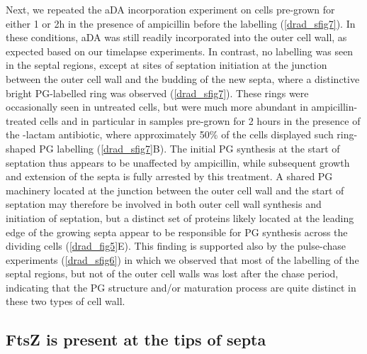 Next, we repeated the aDA incorporation experiment on cells pre-grown for either 1 or 2h in the presence of ampicillin before the labelling (\autoref{drad_sfig7}).
In these conditions, aDA was still readily incorporated into the outer cell wall, as expected based on our timelapse experiments.
In contrast, no labelling was seen in the septal regions, except at sites of septation initiation at the junction between the outer cell wall and the budding of the new septa, where a distinctive bright PG-labelled ring was observed (\autoref{drad_sfig7}).
These rings were occasionally seen in untreated cells, but were much more abundant in ampicillin-treated cells and in particular in samples pre-grown for 2 hours in the presence of the \beta-lactam antibiotic, where approximately 50\% of the cells displayed such ring-shaped PG labelling (\autoref{drad_sfig7}B).
The initial PG synthesis at the start of septation thus appears to be unaffected by ampicillin, while subsequent growth and extension of the septa is fully arrested by this treatment.
A shared PG machinery located at the junction between the outer cell wall and the start of septation may therefore be involved in both outer cell wall synthesis and initiation of septation, but a distinct set of proteins likely located at the leading edge of the growing septa appear to be responsible for PG synthesis across the dividing cells (\autoref{drad_fig5}E).
This finding is supported also by the pulse-chase experiments (\autoref{drad_sfig6}) in which we observed that most of the labelling of the septal regions, but not of the outer cell walls was lost after the chase period, indicating that the PG structure and/or maturation process are quite distinct in these two types of cell wall.

\FloatBarrier

\subsection{FtsZ is present at the tips of septa}\label{drad_ftsz}

